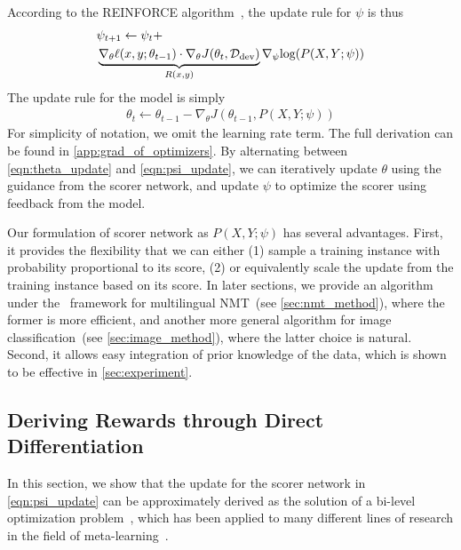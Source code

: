 According to the REINFORCE algorithm~\citep{reinforce}, the update rule for $\psi$ is thus
\begin{equation}
\label{eqn:psi_update}
\begin{aligned}
    & \psi_{t+1} \leftarrow  \psi_t + \\
    &  \underbrace{\nabla_\theta \ell(x, y; \theta_{t-1}) \cdot \nabla_\theta J(\theta_t, \mathcal{D}_\text{dev})}_{\mathclap{R(x, y)}} \nabla_\psi \text{log}(P(X, Y;\psi))
\end{aligned}
\end{equation}
The update rule for the model is simply
\begin{align}
    \label{eqn:theta_update}
    \theta_t \leftarrow \theta_{t-1} - \nabla_\theta J(\theta_{t-1}, P(X, Y;\psi))
\end{align}
For simplicity of notation, we omit the learning rate term. The full derivation can be found in \autoref{app:grad_of_optimizers}. By alternating between \autoref{eqn:theta_update} and \autoref{eqn:psi_update}, we can iteratively update $\theta$ using the guidance from the scorer network, and update $\psi$ to optimize the scorer using feedback from the model.  

Our formulation of scorer network as $P(X, Y; \psi)$ has several advantages. First, it provides the flexibility that we can either (1) sample a training instance with probability proportional to its score, (2) or equivalently scale the update from the training instance based on its score. In later sections, we provide an algorithm under the \dds~framework for multilingual NMT~(see \autoref{sec:nmt_method}), where the former is more efficient, and another more general algorithm for image classification~(see \autoref{sec:image_method}), where the latter choice is natural. Second, it allows easy integration of prior knowledge of the data, which is shown to be effective in \autoref{sec:experiment}. 

\subsection{\label{sec:diff_data_selection}Deriving Rewards through Direct Differentiation}
In this section, we show that the update for the scorer network in \autoref{eqn:psi_update} can be approximately derived as the solution of a bi-level optimization problem~\citep{bilevel_optim}, which has been applied to many different lines of research in the field of meta-learning~\citep{hyper_grad,darts,learn_reweight}. 

